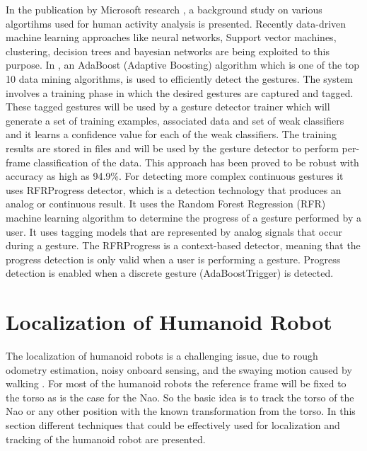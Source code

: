 In the publication by Microsoft research \cite{han2013enhanced}, a background study on various algortihms used for human activity analysis is presented. Recently \cite{KinectSDK2014} data-driven machine learning approaches like neural networks, Support vector machines, clustering, decision trees and bayesian networks are being exploited to this purpose. In \cite{KinectSDK2014}, an AdaBoost (Adaptive Boosting) algorithm \cite{freund1997decision} which is one of the top 10 data mining algorithms, is used to efficiently detect the gestures. The system involves a training phase in which the desired gestures are captured and tagged. These tagged gestures will be used by a gesture detector trainer which will generate a set of training examples, associated data and set of weak classifiers and it learns a confidence value for each of the weak classifiers. The training results are stored in files and will be used by the gesture detector to perform per-frame classification of the data. This approach has been proved to be robust with accuracy as high as 94.9\%. For detecting more complex continuous gestures it uses RFRProgress detector, which is a detection technology that produces an analog or continuous result. It uses the Random Forest Regression (RFR) machine learning algorithm to determine the progress of a gesture performed by a user. It uses tagging models that are represented by analog signals that occur during a gesture. The RFRProgress is a context-based detector, meaning that the progress detection is only valid when a user is performing a gesture. Progress detection is enabled when a discrete gesture (AdaBoostTrigger) is detected.

\section{Localization of Humanoid Robot} %
The localization of humanoid robots is a challenging issue, due to rough odometry estimation, noisy onboard sensing, and the swaying motion caused by walking \cite{cervera2012localization}. For most of the humanoid robots the reference frame will be fixed to the torso as is the case for the Nao. So the basic idea is to track the torso of the Nao or any other position with the known transformation from the torso. In this section different techniques that could be effectively used for localization and tracking of the humanoid robot are presented.

